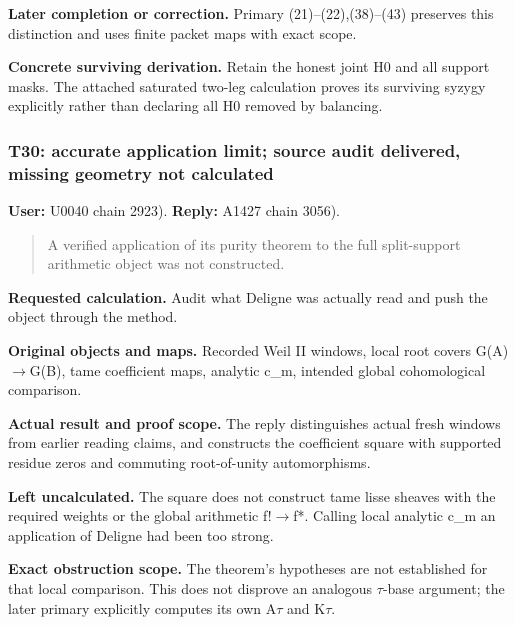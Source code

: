 \textbf{Later completion or correction.} Primary (21)--(22),(38)--(43)
preserves this distinction and uses finite packet maps with exact scope.

\textbf{Concrete surviving derivation.} Retain the honest joint H0 and
all support masks. The attached saturated two-leg calculation proves its
surviving syzygy explicitly rather than declaring all H0 removed by
balancing.

\subsubsection{T30: accurate application limit; source audit delivered,
missing geometry not
calculated}\label{TranscriptLedgerStage:t30-accurate-application-limit-source-audit-delivered-missing-geometry-not-calculated}

\textbf{User:} U0040
\protect{} chain 2923).
\textbf{Reply:} A1427
\protect{} chain 3056).

\begin{quote}
A verified application of its purity theorem to the full split-support
arithmetic object was not constructed.
\end{quote}

\textbf{Requested calculation.} Audit what Deligne was actually read and
push the object through the method.

\textbf{Original objects and maps.} Recorded Weil II windows, local root
covers G(A)\allowbreak{}\ensuremath{→}\allowbreak{}G(B), tame
coefficient maps, analytic c\_m, intended global cohomological
comparison.

\textbf{Actual result and proof scope.} The reply distinguishes actual
fresh windows from earlier reading claims, and constructs the
coefficient square with supported residue zeros and commuting
root-of-unity automorphisms.

\textbf{Left uncalculated.} The square does not construct tame lisse
sheaves with the required weights or the global arithmetic
f!\allowbreak{}\ensuremath{→}\allowbreak{}f*. Calling local analytic
c\_m an application of Deligne had been too strong.

\textbf{Exact obstruction scope.} The theorem's hypotheses are not
established for that local comparison. This does not disprove an
analogous \allowbreak{}\ensuremath{τ}\allowbreak{}-base argument; the
later primary explicitly computes its own
A\allowbreak{}\ensuremath{τ}\allowbreak{} and
K\allowbreak{}\ensuremath{τ}\allowbreak{}.

